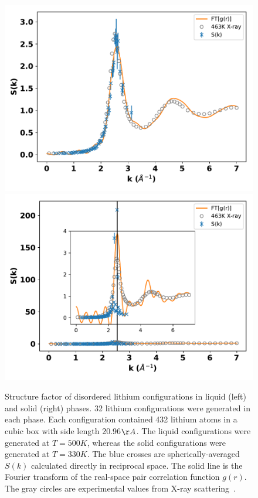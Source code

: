 \documentclass[aps,prl,superscriptaddress]{revtex4-1}
\begin{document}
\begin{figure}[h]
\includegraphics[scale=0.48]{figures/009d_amass-cont1_t500}
\includegraphics[scale=0.48]{figures/009d_amass-temp330}
\caption{Structure factor of disordered lithium configurations in liquid (left) and solid (right) phases. 32 lithium configurations were generated in each phase. Each configuration contained 432 lithium atoms in a cubic box with side length 20.96$\AA$. The liquid configurations were generated at $T=500K$, whereas the solid configurations were generated at $T=330K$. The blue crosses are spherically-averaged $S(k)$ calculated directly in reciprocal space. The solid line is the Fourier transform of the real-space pair correlation function $g(r)$. The gray circles are experimental values from X-ray scattering~\cite{Waseda1981,Mokshin2018}.}
\label{fig:lisk}
\end{figure}
\end{document}
